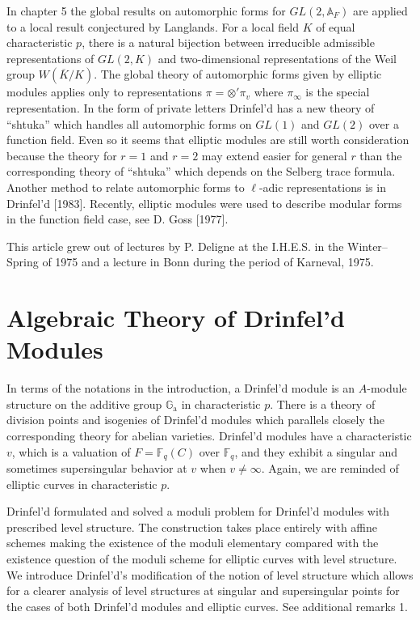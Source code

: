 \documentclass[12pt,a4paper]{article}
\theoremstyle{plain}
\theoremstyle{definition}
\theoremstyle{remark}
\newcommand{\bF}{\mathbb{F}}
\newcommand{\bA}{\mathbb{A}}
\newcommand{\Ga}{\mathbb{G}_\mathrm{a}}
\providecommand{\Ga}{\mathbb{G}_{\mathrm a}}
\begin{document}
In chapter 5 the global results on automorphic forms for $GL(2, \bA_F)$ are applied to a local result conjectured by Langlands. For a local field $K$ of equal characteristic $p$, there is a natural bijection between irreducible admissible representations of $GL(2, K)$ and two-dimensional representations of the Weil group $W(\overline{K}/K)$. The global theory of automorphic forms given by elliptic modules applies only to representations $\pi = \otimes' \pi_v$ where $\pi_\infty$ is the special representation. In the form of private letters Drinfel'd has a new theory of ``shtuka'' which handles all automorphic forms on $GL(1)$ and $GL(2)$ over a function field. Even so it seems that elliptic modules are still worth consideration because the theory for $r = 1$ and $r = 2$ may extend easier for general $r$ than the corresponding theory of ``shtuka'' which depends on the Selberg trace formula. Another method to relate automorphic forms to $\ell$-adic representations is in Drinfel'd [1983]. Recently, elliptic modules were used to describe modular forms in the function field case, see D. Goss [1977].

This article grew out of lectures by P. Deligne at the I.H.E.S. in the Winter--Spring of 1975 and a lecture in Bonn during the period of Karneval, 1975.

\newpage
\section{Algebraic Theory of Drinfel'd Modules}
\label{ch:algebraic}

In terms of the notations in the introduction, a Drinfel'd module is an $A$-module structure on the additive group $\Ga$ in characteristic $p$. There is a theory of division points and isogenies of Drinfel'd modules which parallels closely the corresponding theory for abelian varieties. Drinfel'd modules have a characteristic $v$, which is a valuation of $F = \bF_q(C)$ over $\bF_q$, and they exhibit a singular and sometimes supersingular behavior at $v$ when $v \neq \infty$. Again, we are reminded of elliptic curves in characteristic $p$.

Drinfel'd formulated and solved a moduli problem for Drinfel'd modules with prescribed level structure. The construction takes place entirely with affine schemes making the existence of the moduli elementary compared with the existence question of the moduli scheme for elliptic curves with level structure. We introduce Drinfel'd's modification of the notion of level structure which allows for a clearer analysis of level structures at singular and supersingular points for the cases of both Drinfel'd modules and elliptic curves. See additional remarks 1.
\end{document}
